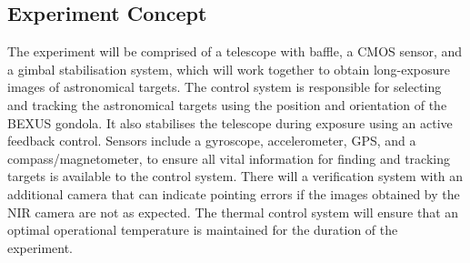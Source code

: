 \subsection{Experiment Concept}

The experiment will be comprised of a telescope with baffle, a CMOS sensor, and a gimbal stabilisation system, which will work together to obtain long-exposure images of astronomical targets. The control system is responsible for selecting and tracking the astronomical targets using the position and orientation of the BEXUS gondola. It also stabilises the telescope during exposure using an active feedback control. Sensors include a gyroscope, accelerometer, GPS, and a compass/magnetometer, to ensure all vital information for finding and tracking targets is available to the control system. There will a verification system with an additional camera that can indicate pointing errors if the images obtained by the NIR camera are not as expected. The thermal control system will ensure that an optimal operational temperature is maintained for the duration of the experiment.
